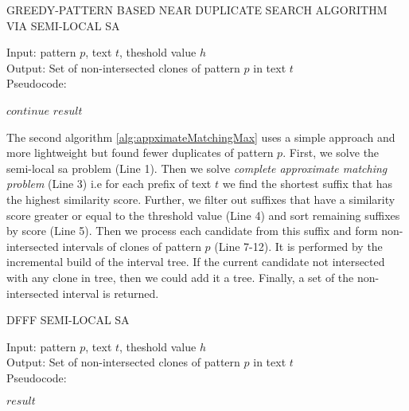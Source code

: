 \begin{algorithm}[H]
\caption{GREEDY-PATTERN BASED NEAR DUPLICATE
SEARCH ALGORITHM VIA SEMI-LOCAL SA}
\label{alg:appximateMatchingGreedy}
Input: pattern $p$, text $t$, theshold value $h$\\
Output: Set of non-intersected clones of pattern $p$ in text $t$\\
Pseudocode:
\begin{algorithmic}[1]
   	\ENDIF
   	\ENDIF
   	
   \ELSE 
   \STATE $continue$ 
   \ENDIF
\ENDWHILE
\RETURN $result$

\end{algorithmic}
\end{algorithm}


The second algorithm \ref{alg:appximateMatchingMax} uses a simple approach and more lightweight but found fewer duplicates of pattern $p$.
First, we solve the semi-local sa problem (Line 1).
Then we solve \emph{complete approximate matching problem} (Line 3) i.e
for each prefix of text $t$ we find the shortest suffix that has the highest similarity score.
Further, we filter out suffixes that have a similarity score greater or equal to the threshold value (Line 4) and sort remaining suffixes by score (Line 5).
Then we process each candidate from this suffix and form non-intersected intervals of clones of pattern $p$ (Line 7-12).
It is performed by the incremental build of the interval tree.
If the current candidate not intersected with any clone in tree, then we could add it a tree.
Finally, a set of the non-intersected interval is returned. 

\begin{algorithm}[H]
\caption{DFFF SEMI-LOCAL SA}
\label{alg:appximateMatchingMax}
Input: pattern $p$, text $t$, theshold value $h$\\
Output: Set of non-intersected clones of pattern $p$ in text $t$\\
Pseudocode:
\begin{algorithmic}[1]

\ENDIF
\ENDFOR
{}
\RETURN $result$
\end{algorithmic}
\end{algorithm}

